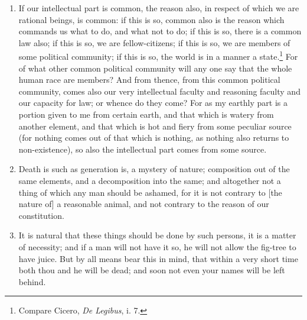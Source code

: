 \begin{enumerate}
This then remains: Remember to retire into this little territory of thy own,\footnote{{Tecum habita, noris quam sit tibi curta supellex}.—Perseus, iv. 52.} and above all do not distract or strain thyself, but be free, and look at things as a man, as a human being, as a citizen, as a mortal. But among the things readiest to thy hand to which thou shalt turn, let there be these, which are two. One is that things do not touch the soul, for they are external and remain immovable; but our perturbations come only from the opinion which is within. The other is that all these things, which thou seest, change immediately and will no longer be; and constantly bear in mind how many of these changes thou hast already witnessed. The universe is transformation: life is opinion.

\item If our intellectual part is common, the reason also, in respect of which we are rational beings, is common: if this is so, common also is the reason which commands us what to do, and what not to do; if this is so, there is a common law also; if this is so, we are fellow-citizens; if this is so, we are members of some political community; if this is so, the world is in a manner a state.\footnote{Compare Cicero, \textit{De Legibus}, i. 7.} For of what other common political community will any one say that the whole human race are members? And from thence, from this common political community, comes also our very intellectual faculty and reasoning faculty and our capacity for law; or whence do they come? For as my earthly part is a portion given to me from certain earth, and that which is watery from another element, and that which is hot and fiery from some peculiar source (for nothing comes out of that which is nothing, as nothing also returns to non-existence), so also the intellectual part comes from some source.

\item Death is such as generation is, a mystery of nature; composition out of the same elements, and a decomposition into the same; and altogether not a thing of which any man should be ashamed, for it is not contrary to [{\clarify the nature of}] a reasonable animal, and not contrary to the reason of our constitution.

\item It is natural that these things should be done by such persons, it is a matter of necessity; and if a man will not have it so, he will not allow the fig-tree to have juice. But by all means bear this in mind, that within a very short time both thou and he will be dead; and soon not even your names will be left behind.


\end{enumerate}
